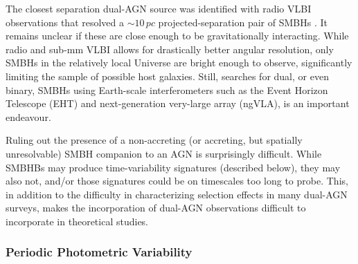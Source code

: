 \documentclass[onecolumn,authoryear]{els-mrw}
\begin{document}
The closest separation dual-AGN source was identified with radio VLBI observations that resolved a $\sim 10 \, pc$ projected-separation pair of SMBHs \citep{Rodriguez+2006}.  It remains unclear if these are close enough to be gravitationally interacting.  While radio and sub-mm VLBI allows for drastically better angular resolution, only SMBHs in the relatively local Universe are bright enough to observe, significantly limiting the sample of possible host galaxies.  Still, searches for dual, or even binary, SMBHs using Earth-scale interferometers such as the Event Horizon Telescope (EHT) and next-generation very-large array (ngVLA), is an important endeavour.

Ruling out the presence of a non-accreting (or accreting, but spatially unresolvable) SMBH companion to an AGN is surprisingly difficult.  While SMBHBs may produce time-variability signatures (described below), they may also not, and/or those signatures could be on timescales too long to probe.  This, in addition to the difficulty in characterizing selection effects in many dual-AGN surveys, makes the incorporation of dual-AGN observations difficult to incorporate in theoretical studies.

\subsubsection{Periodic Photometric Variability}
\end{document}
